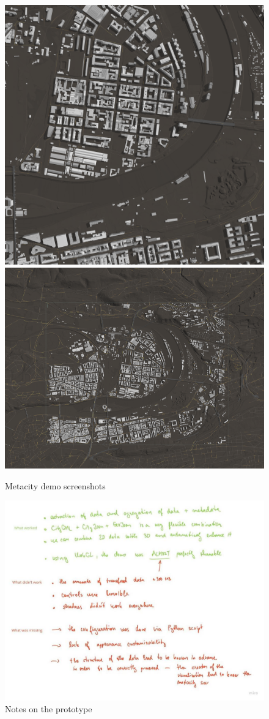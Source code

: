 \begin{figure}[t]
    \centering
    \includegraphics[width=\linewidth]{img/metacity2.png}
    \includegraphics[width=\linewidth]{img/metacity3.png}
    \caption{Metacity demo screenshots}
\end{figure}

\begin{figure}[h]
    \centering
    \includegraphics[width=\linewidth]{img/prototypenotes.jpg}
    \caption{Notes on the prototype}
\end{figure}